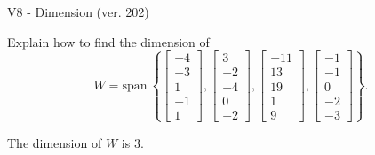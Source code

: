\begin{exercise}
  \begin{exerciseTitle}V8 - Dimension (ver. 202)\end{exerciseTitle}
  \begin{exerciseStatement}
    Explain how to find the dimension of 
\[W=\mathrm{span}\ \left\{\left[\begin{array}{r}
-4 \\
-3 \\
1 \\
-1 \\
1
\end{array}\right] , \left[\begin{array}{r}
3 \\
-2 \\
-4 \\
0 \\
-2
\end{array}\right] , \left[\begin{array}{r}
-11 \\
13 \\
19 \\
1 \\
9
\end{array}\right] , \left[\begin{array}{r}
-1 \\
-1 \\
0 \\
-2 \\
-3
\end{array}\right]\right\}.\]



  \end{exerciseStatement}
  \begin{exerciseAnswer}
   The dimension of \(W\) is  \(3\).
  


  \end{exerciseAnswer}
\end{exercise}